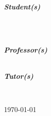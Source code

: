 \begin{titlepage}
    \begin{minipage}{0.5\textwidth}
        \begin{flushleft}
            \large
            \emph{\textbf{Student(s)}}\\
            \student\\
        \end{flushleft}
    \end{minipage}
    ~
    \begin{minipage}{0.4\textwidth}
        \begin{flushright}
            \large
            \emph{\textbf{Professor(s)}} \\
            \teacher \\

            \vspace{0.5cm}

            \emph{\textbf{Tutor(s)}}\\
            \tutor
        \end{flushright}
    \end{minipage}\\[1cm]

    \vfill

    {
        \large \today\par
    }

\end{titlepage}

\restoregeometry